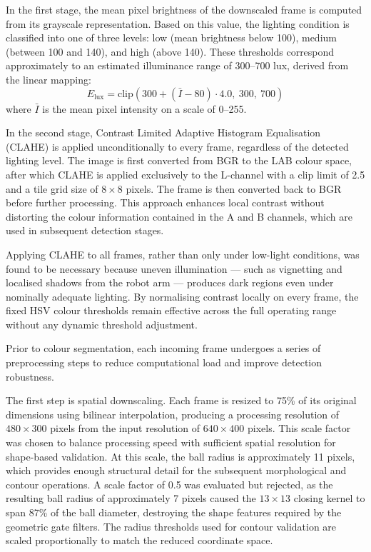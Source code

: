 In the first stage, the mean pixel brightness of the downscaled frame is computed from its
grayscale representation. Based on this value, the lighting condition is classified into one of
three levels: low (mean brightness below 100), medium (between 100 and 140), and high (above
140). These thresholds correspond approximately to an estimated illuminance range of 300--700
lux, derived from the linear mapping:
\begin{equation}
    E_{\text{lux}} = \text{clip}\!\left(300 + (\bar{I} - 80) \cdot 4.0,\ 300,\ 700\right)
\end{equation}
where $\bar{I}$ is the mean pixel intensity on a scale of 0--255.

In the second stage, Contrast Limited Adaptive Histogram Equalisation (CLAHE) is applied
unconditionally to every frame, regardless of the detected lighting level. The image is first
converted from BGR to the LAB colour space, after which CLAHE is applied exclusively to the
L-channel with a clip limit of 2.5 and a tile grid size of $8 \times 8$ pixels. The frame is
then converted back to BGR before further processing. This approach enhances local contrast
without distorting the colour information contained in the A and B channels, which are used in
subsequent detection stages.

Applying CLAHE to all frames, rather than only under low-light conditions, was found to be
necessary because uneven illumination — such as vignetting and localised shadows from the
robot arm — produces dark regions even under nominally adequate lighting. By normalising
contrast locally on every frame, the fixed HSV colour thresholds remain effective across the
full operating range without any dynamic threshold adjustment.


Prior to colour segmentation, each incoming frame undergoes a series of
preprocessing steps to reduce computational load and improve detection robustness.

The first step is spatial downscaling. Each frame is resized to 75\% of its
original dimensions using bilinear interpolation, producing a processing resolution
of $480 \times 300$ pixels from the input resolution of $640 \times 400$ pixels.
This scale factor was chosen to balance processing speed with sufficient spatial
resolution for shape-based validation. At this scale, the ball radius is
approximately 11 pixels, which provides enough structural detail for the subsequent
morphological and contour operations. A scale factor of 0.5 was evaluated but
rejected, as the resulting ball radius of approximately 7 pixels caused the
$13 \times 13$ closing kernel to span 87\% of the ball diameter, destroying the
shape features required by the geometric gate filters. The radius thresholds used
for contour validation are scaled proportionally to match the reduced coordinate
space.

